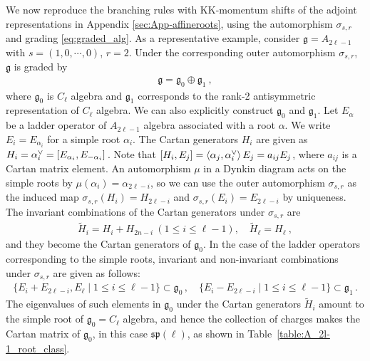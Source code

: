 We now reproduce the branching rules with KK-momentum shifts of the adjoint representations in Appendix \ref{sec:App-affineroots}, using the automorphism $ \sigma_{s,r} $ and grading \eqref{eq:graded_alg}. As a representative example, consider $ \mathfrak{g} = A_{2\ell - 1} $ with $ s = (1, 0, \cdots, 0) $, $ r = 2 $. Under the corresponding outer automorphism $ \sigma_{s,r} $, $ \mathfrak{g} $ is graded by
\begin{align}\label{eq:su(2l)_grading}
\mathfrak{g} = \mathfrak{g}_0 \oplus \mathfrak{g}_1\ ,
\end{align}
where $ \mathfrak{g}_0 $ is $ C_\ell $ algebra and $ \mathfrak{g}_1 $ corresponds to the rank-2 antisymmetric representation of $ C_\ell $ algebra. We can also explicitly construct $ \mathfrak{g}_0 $ and $ \mathfrak{g}_1 $. Let $ E_{\alpha} $ be a ladder operator of $ A_{2\ell - 1} $ algebra associated with a root $ \alpha $. We write $ E_i = E_{\alpha_i} $ for a simple root $ \alpha_i $. The Cartan generators $ H_i $ are given as $ H_i = \alpha_i^\vee = \comm*{E_{\alpha_i}}{E_{-\alpha_i}} $. Note that $ \comm{H_i}{E_j} = \inner{\alpha_j}{\alpha_i^\vee} E_j = a_{ij} E_j $, where $ a_{ij} $ is a Cartan matrix element. An automorphism $ \mu $ in a Dynkin diagram acts on the simple roots by $ \mu(\alpha_i) = \alpha_{2\ell-i} $, so we can use the outer automorphism $ \sigma_{s,r} $ as the induced map $ \sigma_{s,r}(H_i) = H_{2\ell-i} $ and $ \sigma_{s,r}(E_i) = E_{2\ell-i} $ by uniqueness. The invariant combinations of the Cartan generators under $ \sigma_{s,r} $ are 
\begin{align}\label{eq:su(2l)_g0_cartan}
\tilde{H}_i = H_i + H_{2n-i} \ (1 \leq i \leq \ell-1), \quad
\tilde{H}_\ell = H_\ell \ ,
\end{align}
and they become the Cartan generators of $ \mathfrak{g}_0 $. In the case of the ladder operators corresponding to the simple roots, invariant and non-invariant combinations under $ \sigma_{s,r} $ are given as follows:
\begin{align}
\{ E_i + E_{2\ell-i}, E_\ell \mid 1 \leq i \leq \ell-1 \} \subset \mathfrak{g}_0 \, , \quad
\{ E_i - E_{2\ell-i} \mid 1 \leq i \leq \ell-1 \} \subset \mathfrak{g}_1 \, .
\end{align}
The eigenvalues of such elements in $ \mathfrak{g}_0 $ under the Cartan generators $ \tilde{H}_i $ amount to the simple root of $ \mathfrak{g}_0 = C_\ell $ algebra, and hence the collection of charges makes the Cartan matrix of $\mathfrak{g}_0$, in this case $\mathfrak{sp(\ell)}$, as shown in Table~\ref{table:A_2l-1_root_class}.

